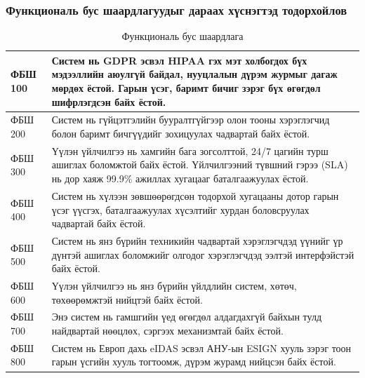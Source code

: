 \subsubsection{Функциональ бус шаардлагуудыг дараах хүснэгтэд тодорхойлов}
\begin{table}[h!]
	\centering
	\caption{Функциональ бус шаардлага}
	\begin{tabular}{ |p{2cm}|p{13cm}| }
		\hline
		ФБШ 100 & Систем нь GDPR эсвэл HIPAA гэх мэт холбогдох бүх мэдээллийн аюулгүй байдал, нууцлалын дүрэм журмыг дагаж мөрдөх ёстой. Гарын үсэг, баримт бичиг зэрэг бүх өгөгдөл шифрлэгдсэн байх ёстой. \\ \hline
		ФБШ 200 & Систем нь гүйцэтгэлийн бууралтгүйгээр олон тооны хэрэглэгчид болон баримт бичгүүдийг зохицуулах чадвартай байх ёстой.                                                                     \\ \hline
		ФБШ 300 & Үүлэн үйлчилгээ нь хамгийн бага зогсолттой, 24/7 цагийн турш ашиглах боломжтой байх ёстой. Үйлчилгээний түвшний гэрээ (SLA) нь дор хаяж 99.9\% ажиллах хугацааг баталгаажуулах ёстой.     \\ \hline
		ФБШ 400 & Систем нь хүлээн зөвшөөрөгдсөн тодорхой хугацааны дотор гарын үсэг үүсгэх, баталгаажуулах хүсэлтийг хурдан боловсруулах чадвартай байх ёстой.                                             \\ \hline
		ФБШ 500 & Систем нь янз бүрийн техникийн чадвартай хэрэглэгчдэд үүнийг үр дүнтэй ашиглах боломжийг олгодог хэрэглэгчдэд ээлтэй интерфэйстэй байх ёстой.                                             \\ \hline
		ФБШ 600 & Үүлэн үйлчилгээ нь янз бүрийн үйлдлийн систем, хөтөч, төхөөрөмжтэй нийцтэй байх ёстой.                                                                                                    \\  \hline
		ФБШ 700 & Энэ систем нь гамшгийн үед өгөгдөл алдагдахгүй байхын тулд найдвартай нөөцлөх, сэргээх механизмтай байх ёстой.                                                                            \\ \hline
		ФБШ 800 & Систем нь Европ дахь eIDAS эсвэл АНУ-ын ESIGN хууль зэрэг тоон гарын үсгийн хууль тогтоомж, дүрэм журамд нийцсэн байх ёстой.                                                              \\ \hline
	\end{tabular}
\end{table}
\newpage

